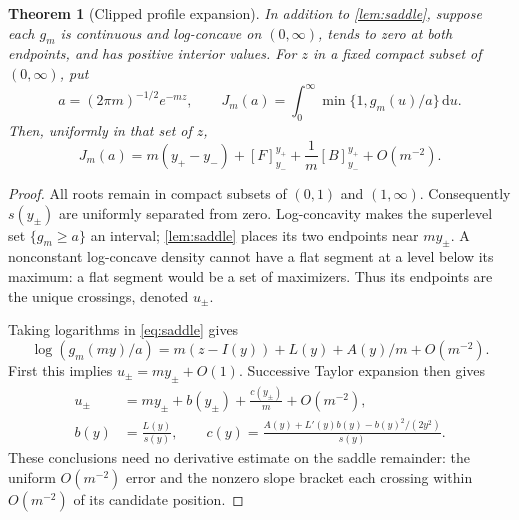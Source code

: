\documentclass[11pt,oneside]{article}
\newtheorem{theorem}{Theorem}[section]
\theoremstyle{remark}\newtheorem{remark}[theorem]{Remark}
\newcommand{\dd}{\,\mathrm d}
\numberwithin{equation}{section}
\begin{document}
\begin{theorem}[Clipped profile expansion]
\label{thm:transfer}
In addition to \cref{lem:saddle}, suppose each $g_m$ is continuous and
log-concave on $(0,\infty)$, tends to zero at both endpoints, and has
positive interior values. For $z$ in a fixed compact subset of $(0,\infty)$,
put
\[
 a=(2\pi m)^{-1/2}e^{-mz},\qquad
 J_m(a)=\int_0^\infty\min\{1,g_m(u)/a\}\dd u.
\]
Then, uniformly in that set of $z$,
\begin{equation}
 J_m(a)=m(y_+-y_-)+[F]_{y_-}^{y_+}
                     +\frac1m[B]_{y_-}^{y_+}+O(m^{-2}).
 \label{eq:J}
\end{equation}
\end{theorem}
\begin{proof}
All roots remain in compact subsets of $(0,1)$ and $(1,\infty)$.
Consequently $s(y_\pm)$ are uniformly separated from zero.
Log-concavity makes the superlevel set $\{g_m\ge a\}$ an interval;
\cref{lem:saddle} places its two endpoints near $my_\pm$. A nonconstant
log-concave density cannot have a flat segment at a level below its maximum:
a flat segment would be a set of maximizers. Thus its endpoints are the
unique crossings, denoted $u_\pm$.

Taking logarithms in \eqref{eq:saddle} gives
\[
 \log(g_m(my)/a)=m(z-I(y))+L(y)+A(y)/m+O(m^{-2}).
\]
First this implies $u_\pm=my_\pm+O(1)$. Successive Taylor expansion then
gives
\begin{align}
 u_\pm&=my_\pm+b(y_\pm)+\frac{c(y_\pm)}m+O(m^{-2}),\label{eq:crossings}\\
 b(y)&=\frac{L(y)}{s(y)},\qquad
 c(y)=\frac{A(y)+L'(y)b(y)-b(y)^2/(2y^2)}{s(y)}.
 \label{eq:bc}
\end{align}
These conclusions need no derivative estimate on the saddle remainder:
the uniform $O(m^{-2})$ error and the nonzero slope bracket each crossing
within $O(m^{-2})$ of its candidate position.


\end{proof}
\end{document}
